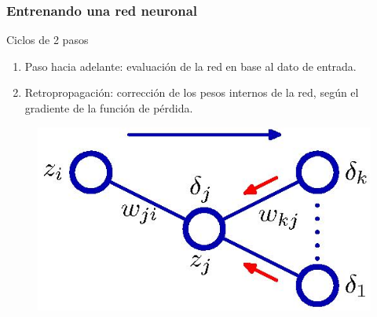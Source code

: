 \documentclass[10pt,center]{beamer}
\begin{document}
\begin{frame}
    \frametitle{Entrenando una red neuronal}
    Ciclos de 2 pasos
    \begin{enumerate}
      \item Paso hacia adelante: evaluación de la red en base al dato de entrada.
      \item Retropropagación: corrección de los pesos internos de la red, según el gradiente de la función de pérdida.
    \end{enumerate}

    \begin{figure}[ht]
      \begin{center}
      \includegraphics[width=0.5\linewidth]{./img/bishop_backpropagation.jpg}
      \end{center}
    \end{figure}
\end{frame}
\end{document}
